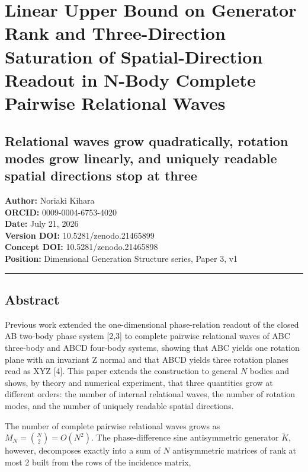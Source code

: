 \documentclass[
  a4paper,
]{article}
\author{}
\date{}
\begin{document}
\section{Linear Upper Bound on Generator Rank and Three-Direction
Saturation of Spatial-Direction Readout in N-Body Complete Pairwise
Relational
Waves}\label{linear-upper-bound-on-generator-rank-and-three-direction-saturation-of-spatial-direction-readout-in-n-body-complete-pairwise-relational-waves}

\subsection{Relational waves grow quadratically, rotation modes grow
linearly, and uniquely readable spatial directions stop at
three}\label{relational-waves-grow-quadratically-rotation-modes-grow-linearly-and-uniquely-readable-spatial-directions-stop-at-three}

\textbf{Author:} Noriaki Kihara\\
\textbf{ORCID:} 0009-0004-6753-4020\\
\textbf{Date:} July 21, 2026\\
\textbf{Version DOI:} 10.5281/zenodo.21465899\\
\textbf{Concept DOI:} 10.5281/zenodo.21465898\\
\textbf{Position:} Dimensional Generation Structure series, Paper 3, v1

\begin{center}\rule{0.5\linewidth}{0.5pt}\end{center}

\subsection{Abstract}\label{abstract}

Previous work extended the one-dimensional phase-relation readout of the
closed AB two-body phase system {[}2,3{]} to complete pairwise
relational waves of ABC three-body and ABCD four-body systems, showing
that ABC yields one rotation plane with an invariant Z normal and that
ABCD yields three rotation planes read as XYZ {[}4{]}. This paper
extends the construction to general \(N\) bodies and shows, by theory
and numerical experiment, that three quantities grow at different
orders: the number of internal relational waves, the number of rotation
modes, and the number of uniquely readable spatial directions.

The number of complete pairwise relational waves grows as
\(M_N=\binom{N}{2}=O(N^2)\). The phase-difference sine antisymmetric
generator \(\widetilde K\), however, decomposes exactly into a sum of
\(N\) antisymmetric matrices of rank at most 2 built from the rows of
the incidence matrix,
\end{document}
